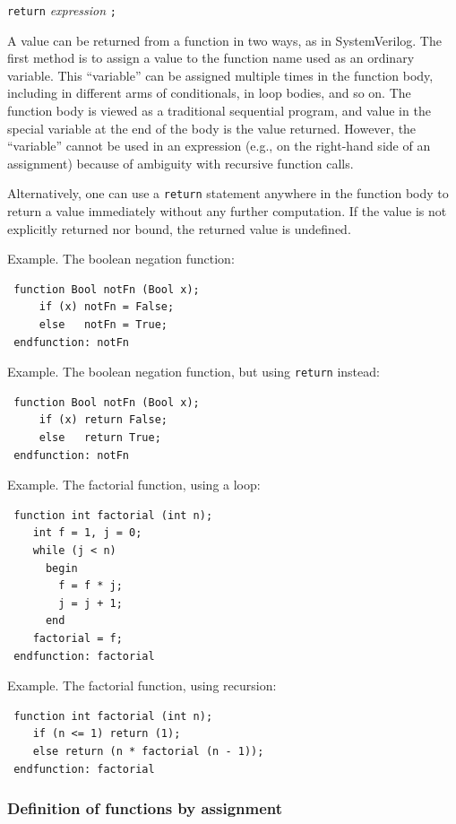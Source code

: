 \documentclass[twoside,letterpaper]{article}
\newcommand{\hm}{\hspace*{1em}}
\newcommand{\SV}{SystemVerilog}
\newcommand{\nterm}[1]{\emph{#1}}
\newcommand{\term}[1]{\texttt{#1}}
\newcommand{\gram}[2]{    \hm\makebox[10em][l]{\it #1}\makebox[1.5em][l]{::=}    #2}
\begin{document}
\gram{returnStmt}{ \term{return} \nterm{expression} \term{;} }

A value can be returned from a function in two ways, as in {\SV}.  The
first method is to assign a value to the function name used as an
ordinary variable.  This ``variable'' can be assigned multiple times
in the function body, including in different arms of conditionals, in
loop bodies, and so on.  The function body is viewed as a traditional
sequential program, and value in the special variable at the end of
the body is the value returned.  However, the ``variable'' cannot be
used in an expression (e.g., on the right-hand side of an assignment)
because of ambiguity with recursive function calls.

Alternatively, one can use a \texttt{return} statement anywhere in the
function body to return a value immediately without any further
computation.  If the value is not explicitly returned nor bound, the
returned value is undefined.

Example.  The boolean negation function:
\begin{verbatim}
 function Bool notFn (Bool x);
     if (x) notFn = False;
     else   notFn = True;
 endfunction: notFn
\end{verbatim}

Example.  The boolean negation function, but using \texttt{return} instead:
\begin{verbatim}
 function Bool notFn (Bool x);
     if (x) return False;
     else   return True;
 endfunction: notFn
\end{verbatim}

Example.  The factorial function, using a loop:
\begin{verbatim}
 function int factorial (int n);
    int f = 1, j = 0;
    while (j < n)
      begin
        f = f * j;
        j = j + 1;
      end
    factorial = f;
 endfunction: factorial
\end{verbatim}

Example.  The factorial function, using recursion:
\begin{verbatim}
 function int factorial (int n);
    if (n <= 1) return (1);
    else return (n * factorial (n - 1));
 endfunction: factorial
\end{verbatim}

\subsubsection{Definition of functions by assignment}
\end{document}
